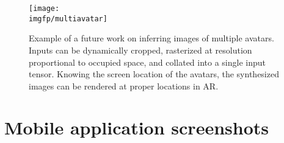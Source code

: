 \begin{figure}
	\centering%
	\setlength\abovedisplayskip{0pt}%
	\texttt{[image: \\imgfp/multiavatar]}%
	\caption{Example of a future work on inferring images of multiple avatars. Inputs can be dynamically cropped, rasterized at resolution proportional to occupied space, and collated into a single input tensor. Knowing the screen location of the avatars, the synthesized images can be rendered at proper locations in AR.}%
	\label{fig:multiavatar}%
	\setlength\belowdisplayskip{0pt}%
\end{figure}
\clearpage
\newpage

\section{Mobile application screenshots}
\label{appb:mobile-screenshots}

